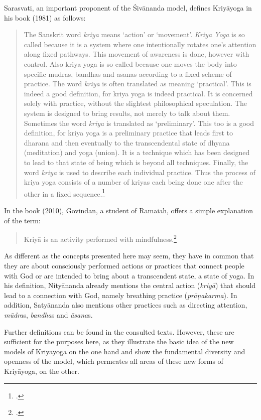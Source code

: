 \citeauthor{kriyayogasarasvati1981} Sarasvati, an important proponent of the Śivānanda model, defines Kriyāyoga in his book  (1981) as follows: \begin{quote} The Sanskrit word \textit{kriya} means `action' or `movement'. \textit{Kriya Yoga} is so called because it is a system where one intentionally rotates one's attention along fixed pathways. This movement of awareness is done, however with control. Also kriya yoga is so called because one moves the body into specific mudras, bandhas and asanas according to a fixed scheme of practice. The word \textit{kriya} is often translated as meaning `practical'. This is indeed a good definition, for kriya yoga is indeed practical. It is concerned solely with practice, without the slightest philosophical speculation. The system is designed to bring results, not merely to talk about them. Sometimes the word \textit{kriya} is translated as `preliminary'. This too is a good definition, for kriya yoga is a preliminary practice that leads first to dharana and then eventually to the transcendental state of dhyana (meditation) and yoga (union). It is a technique which has been designed to lead to that state of being which is beyond all techniques. Finally, the word \textit{kriya} is used to describe each individual practice. Thus the process of kriya yoga consists of a number of kriyas each being done one after the other in a fixed sequence.\footnote{\citeauthor[1981: 699]{kriyayogasarasvati1981}.}\end{quote}
In the book  (2010), Govindan, a student of Ramaiah, offers a simple explanation of the term: \begin{quote} Kriyā is an activity performed with mindfulness.\footnote{\citeauthor[2010: 214]{govindan2010}.}\end{quote}

As different as the concepts presented here may seem, they have in common that they are about consciously performed actions or practices that connect people with God or are intended to bring about a transcendent state, a state of yoga. In his definition, Nityānanda already mentions the central action (\textit{kriyā}) that should lead to a connection with God, namely breathing practice (\textit{prāṇakarma}). In addition, Satyānanda also mentions other practices such as directing attention, \textit{mūdra}s, \textit{bandha}s and \textit{āsana}s.  

Further definitions can be found in the consulted texts. However, these are sufficient for the purposes here, as they illustrate the basic idea of the new models of Kriyāyoga on the one hand and show the fundamental diversity and openness of the model, which permeates all areas of these new forms of Kriyāyoga, on the other.  

